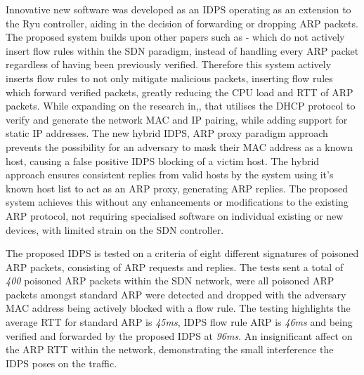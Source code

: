 \documentclass[12pt, oneside]{book}
\begin{document}
Innovative new software was developed as an IDPS
operating as an extension to the Ryu controller, aiding in the decision of forwarding or dropping ARP packets.
The proposed system builds upon other papers such as \cite{alharbi2016securing}-\cite{masoud2015preventing}
which do not actively insert flow rules within the SDN paradigm, instead of handling
every ARP packet regardless of having been previously verified.
Therefore this system actively inserts flow rules to not only mitigate malicious packets, inserting flow rules which
forward verified packets, greatly reducing the CPU load and RTT of ARP packets.
While expanding on the research in\cite{masoud2015preventing},\cite{abdelsalam2015mitigating}, 
that utilises the DHCP protocol to verify and generate the network MAC and IP pairing, while adding support
for static IP addresses. The new hybrid IDPS, ARP proxy paradigm approach prevents
the possibility for an adversary to mask their MAC address as a known host, causing a false positive
IDPS blocking of a victim host. The hybrid approach ensures consistent replies from valid hosts
by the system using it's known host list to act as an ARP proxy, generating ARP replies.
The proposed system achieves this without any enhancements or modifications to the existing ARP protocol,
not requiring specialised software on individual existing or new devices, with limited strain on the SDN controller. \newline


The proposed IDPS is tested on a criteria of eight different signatures of poisoned ARP packets, consisting
of ARP requests and replies. The tests sent a total of \emph{400} poisoned ARP packets within the SDN network, were
all poisoned ARP packets amongst standard ARP were detected and dropped with the adversary MAC address being
actively blocked with a flow rule.
The testing highlights the average RTT for standard ARP is \emph{45ms}, IDPS flow rule ARP is \emph{46ms}
and being verified and forwarded by the proposed IDPS at \emph{96ms}. An insignificant
affect on the ARP RTT within the network, demonstrating the small interference the IDPS poses on the traffic.


\end{document}
